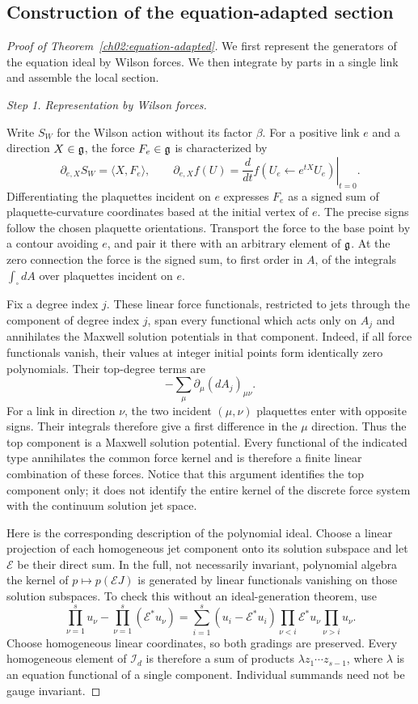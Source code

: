 \subsection{Construction of the equation-adapted section}

\begin{proof}[Proof of Theorem~\ref{ch02:equation-adapted}]
We first represent the generators of the equation ideal by Wilson forces.
We then integrate by parts in a single link and assemble the local section.

\smallskip\noindent\emph{Step 1. Representation by Wilson forces.}

Write $S_W$ for the Wilson action without its factor $\beta$.
For a positive link $e$ and a direction $X\in\mathfrak g$,
the force $F_e\in\mathfrak g$ is characterized by
\[
 \partial_{e,X}S_W=\langle X,F_e\rangle,\qquad
 \partial_{e,X}f(U)=
 \left.\frac{d}{dt}f(U_e\leftarrow e^{tX}U_e)\right|_{t=0}.
\]
Differentiating the plaquettes incident on $e$ expresses $F_e$
as a signed sum of plaquette-curvature coordinates based at the
initial vertex of $e$. The precise signs follow the chosen
plaquette orientations. Transport the force to the base point by a
contour avoiding $e$, and pair it there with an arbitrary element of $\mathfrak g$.
At the zero connection the force is the signed sum, to first order in
$A$, of the integrals $\int_\square dA$ over plaquettes incident on $e$.

Fix a degree index $j$. These linear force functionals, restricted to jets
through the component of degree index $j$, span every functional which acts only on $A_j$
and annihilates the Maxwell solution potentials in that component.
Indeed, if all force functionals vanish, their values at integer
initial points form identically zero polynomials. Their top-degree
terms are
\[
 -\sum_\mu\partial_\mu(dA_j)_{\mu\nu}.
\]
For a link in direction $\nu$, the two incident $(\mu,\nu)$ plaquettes
enter with opposite signs. Their integrals therefore give a first
difference in the $\mu$ direction. Thus the top component is a Maxwell
solution potential. Every functional of the indicated type
annihilates the common force kernel and is therefore a finite
linear combination of these forces. Notice that this argument
identifies the top component only; it does not identify the entire
kernel of the discrete force system with the continuum solution
jet space.

Here is the corresponding description of the polynomial ideal.
Choose a linear projection of each homogeneous jet component onto its solution
subspace and let $\mathcal E$ be their direct sum. In the full,
not necessarily invariant, polynomial algebra the kernel of
$p\mapsto p(\mathcal EJ)$ is generated by linear functionals
vanishing on those solution subspaces. To check this without
an ideal-generation theorem, use
\[
 \prod_{\nu=1}^s u_\nu-\prod_{\nu=1}^s(\mathcal E^*u_\nu)
 =\sum_{i=1}^s
 (u_i-\mathcal E^*u_i)
 \prod_{\nu<i}\mathcal E^*u_\nu
 \prod_{\nu>i}u_\nu .
\]
Choose homogeneous linear coordinates, so both gradings are
preserved. Every homogeneous element of $\mathcal I_d$ is
therefore a sum of products $\lambda z_1\cdots z_{s-1}$,
where $\lambda$ is an equation functional of a single component.
Individual summands need not be gauge invariant.


\end{proof}
